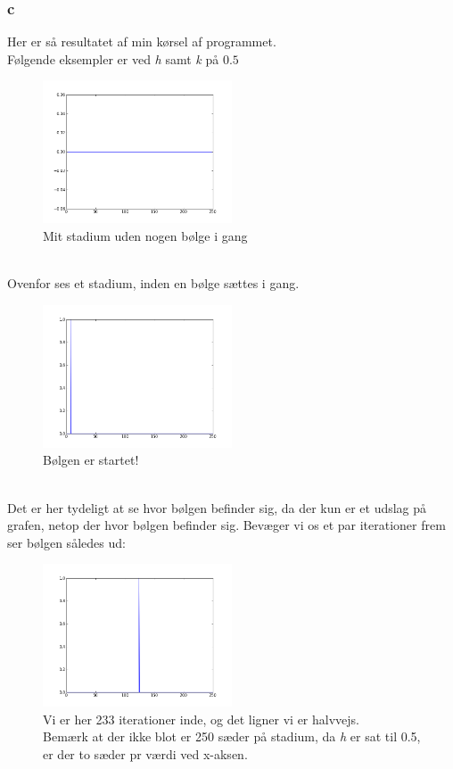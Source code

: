 \documentclass[11pt]{article} %
\begin{document}
\subsubsection*{c}
Her er så resultatet af min kørsel af programmet.\\ Følgende eksempler er ved \textit{h} samt \textit{k} på $0.5$\\
\begin{figure}[h!]
\centering
   \includegraphics[width=0.5\textwidth]{bild1}
  \caption{Mit stadium uden nogen bølge i gang}
\end{figure}
\\Ovenfor ses et stadium, inden en bølge sættes i gang.
\\
\begin{figure}[h!]
\centering
   \includegraphics[width=0.5\textwidth]{bild2}
  \caption{Bølgen er startet!}
\end{figure}\\
Det er her tydeligt at se hvor bølgen befinder sig, da der kun er et udslag på grafen, netop der hvor bølgen befinder sig.
\newpage
Bevæger vi os et par iterationer frem ser bølgen således ud:
\begin{figure}[h!]
\centering
   \includegraphics[width=0.5\textwidth]{midvejs}
  \caption{Vi er her 233 iterationer inde, og det ligner vi er halvvejs.\\
  Bemærk at der ikke blot er 250 sæder på stadium, da \textit{h} er sat til 0.5, er der to sæder pr værdi ved x-aksen.}
\end{figure}
\end{document}
